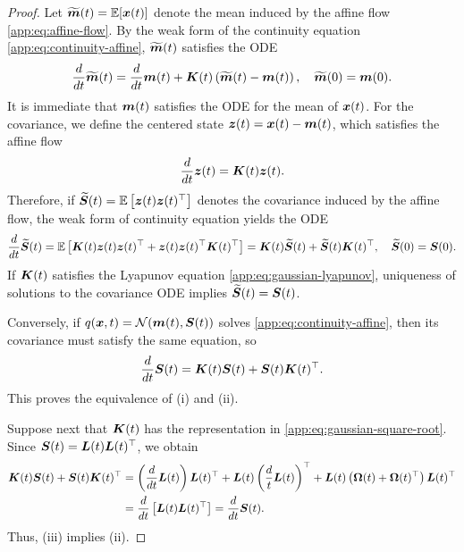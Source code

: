 \begin{proof}
Let $\widetilde{\boldsymbol{m}}(t) = \mathbb{E}[\boldsymbol{x}(t)]$
denote the mean induced by the affine flow \cref{app:eq:affine-flow}. 
By the weak form of the continuity equation \cref{app:eq:continuity-affine}, $\widetilde{\boldsymbol{m}}(t)$ satisfies the ODE
\begin{equation*}
    \frac{d}{d t}\widetilde{\boldsymbol{m}}(t) = \frac{d}{d t}\boldsymbol{m}(t) + \boldsymbol{K}(t) \left(\widetilde{\boldsymbol{m}}(t)-\boldsymbol{m}(t) \right), \quad 
    \widetilde{\boldsymbol{m}}(0) = \boldsymbol{m}(0).
\end{equation*}
It is immediate that $\boldsymbol{m}(t)$ satisfies the ODE for the mean of $\boldsymbol{x}(t)$. 
For the covariance, we define the centered state $\boldsymbol{z}(t) = \boldsymbol{x}(t)-\boldsymbol{m}(t)$, which satisfies the affine flow
\begin{equation*}
    \frac{d}{d t}\boldsymbol{z}(t) = \boldsymbol{K}(t)\boldsymbol{z}(t).
\end{equation*}
Therefore, if $\widetilde{\boldsymbol{S}}(t) = \mathbb{E} \left[ \boldsymbol{z}(t)\boldsymbol{z}(t)^\top \right]$ denotes the covariance induced by the affine flow, the weak form of continuity equation yields the ODE
\begin{equation*}
    \frac{d}{d t}\widetilde{\boldsymbol{S}}(t) =\mathbb{E}\left[ \boldsymbol{K}(t)\boldsymbol{z}(t)\boldsymbol{z}(t)^\top + \boldsymbol{z}(t)\boldsymbol{z}(t)^\top\boldsymbol{K}(t)^\top\right] = \boldsymbol{K}(t)\widetilde{\boldsymbol{S}}(t) + \widetilde{\boldsymbol{S}}(t)\boldsymbol{K}(t)^\top, \quad  \widetilde{\boldsymbol{S}}(0)=\boldsymbol{S}(0).
\end{equation*}
If $\boldsymbol{K}(t)$ satisfies the Lyapunov equation
\cref{app:eq:gaussian-lyapunov}, uniqueness of solutions to the covariance ODE implies $\widetilde{\boldsymbol{S}}(t)=\boldsymbol{S}(t)$. 

Conversely, if $q(\boldsymbol{x},t)=\mathcal{N}(\boldsymbol{m}(t),\boldsymbol{S}(t))$ solves
\cref{app:eq:continuity-affine}, then its covariance must satisfy the same equation, so
\begin{equation*}
    \frac{d}{d t}\boldsymbol{S}(t) = \boldsymbol{K}(t)\boldsymbol{S}(t) + \boldsymbol{S}(t)\boldsymbol{K}(t)^\top.
\end{equation*}
This proves the equivalence of \textnormal{(i)} and \textnormal{(ii)}.

Suppose next that $\boldsymbol{K}(t)$ has the representation in
\eqref{app:eq:gaussian-square-root}. Since
$\boldsymbol{S}(t)=\boldsymbol{L}(t)\boldsymbol{L}(t)^\top$, we obtain
\begin{equation*}
\begin{aligned}
    \boldsymbol{K}(t)\boldsymbol{S}(t)+\boldsymbol{S}(t)\boldsymbol{K}(t)^\top &= \left(\frac{d}{d t}\boldsymbol{L}(t) \right)\boldsymbol{L}(t)^\top + \boldsymbol{L}(t) \left(\frac{d}{t}\boldsymbol{L}(t)  \right)^\top + \boldsymbol{L}(t) \left( \boldsymbol{\Omega}(t)+\boldsymbol{\Omega}(t)^\top\right)\boldsymbol{L}(t)^\top\\
    &= \frac{d}{d t} \left[\boldsymbol{L}(t)\boldsymbol{L}(t)^\top\right] =
    \frac{d}{d t}\boldsymbol{S}(t).
\end{aligned}
\end{equation*}
Thus, (iii) implies (ii).


\end{proof}
